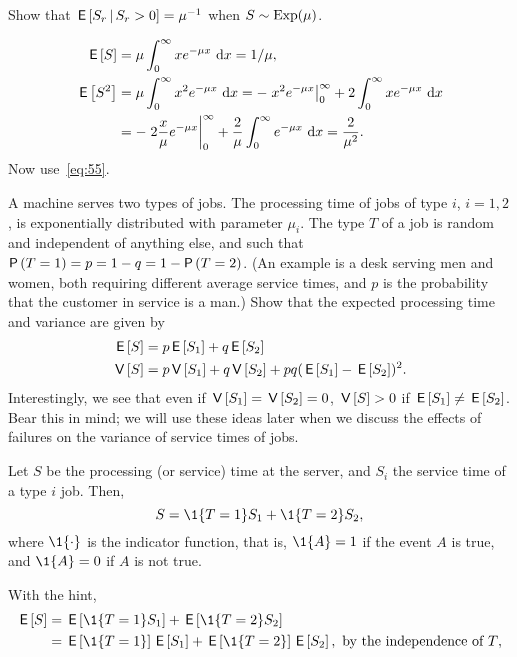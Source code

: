 \begin{extra}
 Show that $\,\mathsf{E}\left[S_r\,\middle|\, S_r>0\right] = \mu^{-1}$ when $S\sim \operatorname{Exp}(\mu)$.
\begin{solution}
 \begin{align*}
\,\mathsf{E}\left[S\right] &= \mu \int_0^\infty x e^{-\mu x}\,\,\text{d}x = 1/\mu, \\
\,\mathsf{E}\left[S^2\right] 
&= \mu \int_0^\infty x^2 e^{- \mu x} \,\,\text{d}x = - \left. x^2 e^{-\mu x} \right|_0^\infty + 2 \int_0^\infty x e^{-\mu x} \, \,\text{d}x \\
&= -\left. 2\frac x \mu e^{-\mu x} \right|_0^\infty + \frac 2 \mu\int_0^\infty e^{-\mu x} \, \,\text{d}x =\frac2{\mu^2}.
 \end{align*}
Now use~\cref{eq:55}.
\end{solution}
\end{extra}


\begin{extra}
 A machine serves two types of jobs.
 The processing time of jobs of type $i$, $i=1,2$, is exponentially distributed with parameter $\mu_i$.
 The type $T$ of a job is random and independent of anything else, and such that $\P{T=1} = p = 1-q = 1-\P{T=2}$.
 (An example is a desk serving men and women, both requiring different average service times, and $p$ is the probability that the customer in service is a man.)
 Show that the expected processing time and variance are given by
\begin{align*}
 \,\mathsf{E}\left[S\right] &= p \,\mathsf{E}\left[S_1\right] + q \,\mathsf{E}\left[S_2\right] \\
\,\mathsf{V}\left[S\right] &= p \,\mathsf{V}\left[S_1\right] + q \,\mathsf{V}\left[S_2\right] + pq(\,\mathsf{E}\left[S_1\right] - \,\mathsf{E}\left[S_2\right])^2.
 \end{align*}
Interestingly, we see that even if $\,\mathsf{V}\left[S_1\right] = \,\mathsf{V}\left[S_2\right] = 0$, $\,\mathsf{V}\left[S\right] > 0$
if $\,\mathsf{E}\left[S_1\right] \neq \,\mathsf{E}\left[S_2\right]$. Bear this in mind; we will use these ideas
later when we discuss the effects of failures on the variance of
service times of jobs.
\begin{hint}
 Let $S$ be the processing (or service) time at the server, and
 $S_i$ the service time of a type $i$ job. Then, 
 \begin{equation*}
 S = \1{T=1} S_1 + \1{T=2} S_2,
 \end{equation*}
 where $\1{\cdot}$ is the indicator function, that is, $\1{A}=1$ if the
 event $A$ is true, and $\1{A}=0$ if $A$ is not true. 
\end{hint}
\begin{solution}
With the hint, 
\begin{align*}
 \E S 
&= \E{\1{T=1} S_1} + \E{\1{T=2} S_2} \\
&= \E{\1{T=1}} \E{ S_1} + \E{\1{T=2}} \E{S_2}, \text{ by the independence of $T$}, \\

\end{align*}
\end{solution}
\end{extra}
